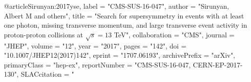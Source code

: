 @article{Sirunyan:2017yse,
      label          = "CMS-SUS-16-047",
      author         = "Sirunyan, Albert M and others",
      title          = "{Search for supersymmetry in events with at least one
                        photon, missing transverse momentum, and large transverse
                        event activity in proton-proton collisions at $
                        \sqrt{s}=13 $ TeV}",
      collaboration  = "CMS",
      journal        = "JHEP",
      volume         = "12",
      year           = "2017",
      pages          = "142",
      doi            = "10.1007/JHEP12(2017)142",
      eprint         = "1707.06193",
      archivePrefix  = "arXiv",
      primaryClass   = "hep-ex",
      reportNumber   = "CMS-SUS-16-047, CERN-EP-2017-130",
      SLACcitation   = "%
}

